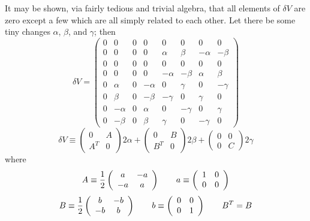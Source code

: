 \documentclass[12pt]{article}
\begin{document}
 It may be shown, via fairly tedious and trivial algebra, that all
elements of $\delta V$ are zero except a few which are all simply related
to each other.  Let there be some tiny changes $\alpha$, $\beta$, and $\gamma$;
then
\begin{equation}
\delta V = \left(
\begin{array}{cccccccc}
 0 &  0 &  0 &  0 &  0 &  0 &  0 &  0 \\
 0 &  0 &  0 &  0 &  \alpha &  \beta &  -\alpha &  -\beta \\
 0 &  0 &  0 &  0 &  0 &  0 &  0 &  0 \\
 0 &  0 &  0 &  0 &  -\alpha &  -\beta &  \alpha &  \beta \\
 0 &  \alpha &  0 &  -\alpha &  0 &  \gamma &  0 &  -\gamma \\
 0 &  \beta &  0 &  -\beta &  -\gamma &  0 &  \gamma &  0 \\
 0 &  -\alpha &  0 &  \alpha &  0 &  -\gamma &  0 &  \gamma \\
 0 &  -\beta &  0 &  \beta &  \gamma &  0 &  -\gamma &  0
\end{array}
\right) 
\end{equation}
\begin{equation}
\delta V 
\equiv \left( \begin{array}{cc} 0 & A \\ A^T & 0 \end{array} \right) 2\alpha +
\left( \begin{array}{cc} 0 & B \\ B^T & 0 \end{array} \right) 2\beta +
\left( \begin{array}{cc} 0 & 0 \\ 0 & C \end{array} \right) 2\gamma
\end{equation}
where
$$
A \equiv {1 \over 2} 
\left( \begin{array}{cc} a & -a \\ -a & a \\ \end{array} \right) \quad \quad
a \equiv \left( \begin{array}{cc} 1 & 0 \\ 0 & 0 \\ \end{array} \right)
$$
$$
B \equiv {1 \over 2} 
\left( \begin{array}{cc} b & -b \\ -b & b \\ \end{array} \right) \quad \quad
b \equiv \left( \begin{array}{cc} 0 & 0 \\ 0 & 1 \\ \end{array} \right) \quad \quad
B^T = B
$$
\end{document}
